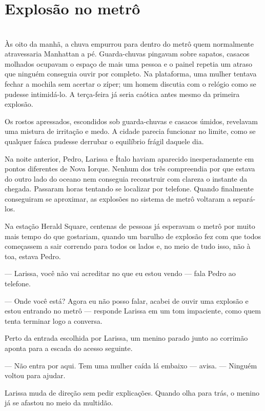 \newpage
\ifdefined\useChapters
\chapter{Explosão no metrô}
\else
\chapter{}
\fi

Às oito da manhã, a chuva empurrou para dentro do metrô quem normalmente atravessaria Manhattan a pé. Guarda-chuvas pingavam sobre sapatos, casacos molhados ocupavam o espaço de mais uma pessoa e o painel repetia um atraso que ninguém conseguia ouvir por completo. Na plataforma, uma mulher tentava fechar a mochila sem acertar o zíper; um homem discutia com o relógio como se pudesse intimidá-lo. A terça-feira já seria caótica antes mesmo da primeira explosão.

Os rostos apressados, escondidos sob guarda-chuvas e casacos úmidos, revelavam uma mistura de irritação e medo. A cidade parecia funcionar no limite, como se qualquer faísca pudesse derrubar o equilíbrio frágil daquele dia.

Na noite anterior, Pedro, Larissa e Ítalo haviam aparecido inesperadamente em pontos diferentes de Nova Iorque. Nenhum dos três compreendia por que estava do outro lado do oceano nem conseguia reconstruir com clareza o instante da chegada. Passaram horas tentando se localizar por telefone. Quando finalmente conseguiram se aproximar, as explosões no sistema de metrô voltaram a separá-los.

Na estação Herald Square, centenas de pessoas já esperavam o metrô por muito mais tempo do que gostariam, quando um barulho de explosão fez com que todos começassem a sair correndo para todos os lados e, no meio de tudo isso, não à toa, estava Pedro.

— Larissa, você não vai acreditar no que eu estou vendo — fala Pedro ao telefone.

— Onde você está? Agora eu não posso falar, acabei de ouvir uma explosão e estou entrando no metrô — responde Larissa em um tom impaciente, como quem tenta terminar logo a conversa.

Perto da entrada escolhida por Larissa, um menino parado junto ao corrimão aponta para a escada do acesso seguinte.

— Não entra por aqui. Tem uma mulher caída lá embaixo — avisa. — Ninguém voltou para ajudar.

Larissa muda de direção sem pedir explicações. Quando olha para trás, o menino já se afastou no meio da multidão.

